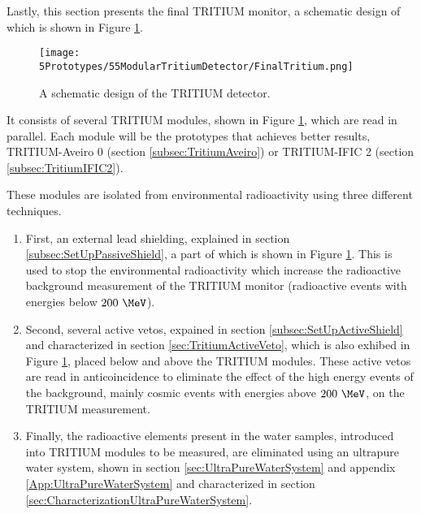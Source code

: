 Lastly, this section presents the final TRITIUM monitor, a schematic design of which is shown in Figure \ref{fig:TritiumDetectorSchematicDesign}.

\begin{figure}[h]
\centering
\texttt{[image: 5Prototypes/55ModularTritiumDetector/FinalTritium.png]}
\caption{A schematic design of the TRITIUM detector.\label{fig:TritiumDetectorSchematicDesign}}
\end{figure}

It consists of several TRITIUM modules, shown in Figure \ref{fig:TritiumDetectorSchematicDesign}, which are read in parallel. Each module will be the prototypes that achieves better results, TRITIUM-Aveiro 0 (section \ref{subsec:TritiumAveiro}) or TRITIUM-IFIC 2 (section \ref{subsec:TritiumIFIC2}).

These modules are isolated from environmental radioactivity using three different techniques.

\begin{enumerate}

\item{} First, an external lead shielding, explained in section \ref{subsec:SetUpPassiveShield}, a part of which is shown in Figure \ref{fig:TritiumDetectorSchematicDesign}. This is used to stop the environmental radioactivity which increase the radioactive background measurement of the TRITIUM monitor (radioactive events with energies below $200~\MeV$).

\item{} Second, several active vetos, expained in section \ref{subsec:SetUpActiveShield} and characterized in section \ref{sec:TritiumActiveVeto}, which is also exhibed in Figure \ref{fig:TritiumDetectorSchematicDesign}, placed below and above the TRITIUM modules. These active vetos are read in anticoincidence to eliminate the effect of the high energy events of the background, mainly cosmic events with energies above $200~\MeV$, on the TRITIUM measurement.

\item{} Finally, the radioactive elements present in the water samples, introduced into TRITIUM modules to be measured, are eliminated using an ultrapure water system, shown in section \ref{sec:UltraPureWaterSystem} and appendix \ref{App:UltraPureWaterSystem} and characterized in section \ref{sec:CharacterizationUltraPureWaterSystem}.

\end{enumerate}

